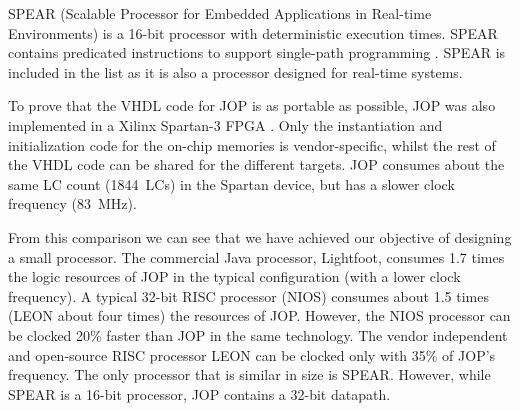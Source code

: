  

SPEAR \cite{Delvai:ECRTS2003} (Scalable Processor for Embedded
Applications in Real-time Environments) is a 16-bit processor with
deterministic execution times. SPEAR contains predicated
instructions to support single-path programming
\cite{Puschner:WORDS2005}. SPEAR is included in the list as it is
also a processor designed for real-time systems.

To prove that the VHDL code for JOP is as portable as possible, JOP
was also implemented in a Xilinx Spartan-3 FPGA \cite{Spartan3}.
Only the instantiation and initialization code for the on-chip
memories is vendor-specific, whilst the rest of the VHDL code can be
shared for the different targets. JOP consumes about the same LC
count (1844~LCs) in the Spartan device, but has a slower clock
frequency (83~MHz).

From this comparison we can see that we have achieved our objective
of designing a small processor. The commercial Java processor,
Lightfoot, consumes 1.7 times the logic resources of JOP in the
typical configuration (with a lower clock frequency). A typical
32-bit RISC processor (NIOS) consumes about 1.5 times (LEON about
four times) the resources of JOP. However, the NIOS processor can be
clocked 20\% faster than JOP in the same technology. The vendor
independent and open-source RISC processor LEON can be clocked only
with 35\% of JOP's frequency. The only processor that is similar in
size is SPEAR. However, while SPEAR is a 16-bit processor, JOP
contains a 32-bit datapath.



